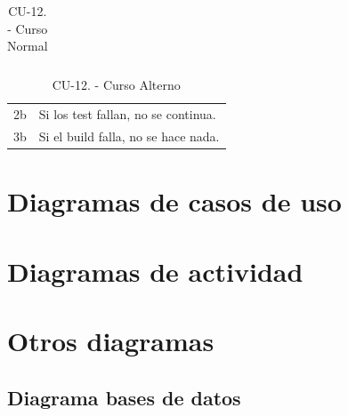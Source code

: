 \begin{itemize}
\begin{table}[H]
\begin{tabularx}{\textwidth}{|l|X|l|X|}
                                
    \end{tabularx}
    \caption{CU-12. - Curso Normal}
    \label{my-label}
  \end{table}
  \begin{table}[H]
    \centering
    \begin{tabularx}{\textwidth}{|l|X|}
     \hline
     \rowcolor[HTML]{C0C0C0} 
     \multicolumn{2}{|l|}{\cellcolor[HTML]{C0C0C0}Curso Alterno} \\ \hline
     \rowcolor[HTML]{FFFFFF} 
            2b                      & Si los test fallan, no se continua.                           \\ \hline
            3b                      & Si el build falla, no se hace nada.                           \\ \hline
    \end{tabularx}
    \caption{CU-12. - Curso Alterno}
    \label{my-label}
  \end{table}
\end{itemize}


\section {Diagramas de casos de uso}
\section {Diagramas de actividad}
\section {Otros diagramas}
\subsection {Diagrama  bases de datos}
